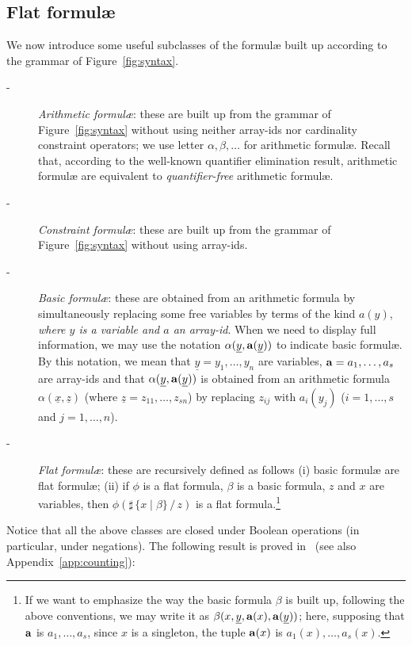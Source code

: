 \documentclass[11pt,a4paper]{article}
\newcommand{\formulae}{formul\ae\xspace}
\newcommand{\ux}{\ensuremath{\underline x}}
\newcommand{\uy}{\ensuremath{\underline y}}
\newcommand{\uz}{\ensuremath{\underline z}}
\newcommand{\ta}{\ensuremath{{\bf a}}\xspace}
\begin{document}
\subsection{Flat  \formulae}
We now introduce some useful subclasses
of the \formulae built up according to the grammar of Figure~\ref{fig:syntax}.
\begin{description}
  \item[-] \emph{Arithmetic \formulae}: these are built up from the  grammar of Figure~\ref{fig:syntax} without using
 neither array-ids nor cardinality constraint operators; we use letter $\alpha, \beta, \dots$ for
 arithmetic \formulae. Recall that, according to the well-known quantifier elimination result, arithmetic \formulae are equivalent 
 to \emph{quantifier-free} arithmetic \formulae. 
  \item[-] \emph{Constraint \formulae}: these are built up from the  grammar of Figure~\ref{fig:syntax} without using
 array-ids.
  \item[-] \emph{Basic \formulae}: these are obtained from an arithmetic formula by simultaneously replacing some free variables by terms of the kind $a(y)$, \emph{where $y$ is a variable
  and $a$ an array-id}. When we need to display full information, we may use the notation $\alpha(\uy, \ta(\uy))$  to indicate basic \formulae. By this notation, we mean that $\uy=y_1, \dots, y_n$ are variables,
$\ta=a_1, \dots, a_s$ are array-ids and that $\alpha(\uy, \ta(\uy))$ is obtained from an arithmetic formula $\alpha(\ux, \uz)$ (where $\uz=z_{11}, \dots, z_{sn}$)
by replacing $z_{ij}$ with $a_i(y_j)$ ($i=1, \dots, s$ and $j=1,\dots, n$). 
\item[-] \emph{Flat \formulae}: these are recursively defined as follows (i) basic \formulae are flat \formulae; (ii) if $\phi$ is 
a flat  formula, $\beta$ is a basic formula, $z$ and $x$ are variables, 
  then $\phi(\sharp\,\{x\!\mid\! \beta\}\,/\,z)$ is 
a flat formula.\footnote{ If we want to emphasize the way 
the basic formula
  $\beta$ is built up, 
  following the above conventions,
  we may write it as 
$\beta(x, \uy,\ta(x), \ta(\uy))$; here, supposing that  
  $\ta$ is $a_1, \dots, a_s$, since $x$ is a singleton, the tuple
  $\ta(x)$ is $a_1(x), \dots, a_s(x)$.
  }
 \end{description}

Notice that all the above classes are closed under Boolean operations (in particular, under negations). 
The following result is proved in~\cite{schweikhart} (see also Appendix~\ref{app:counting}):
\end{document}
